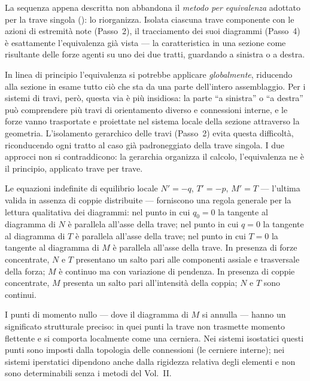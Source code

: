 \begin{oss}
	La sequenza appena descritta non abbandona il
	\emph{metodo per equivalenza} adottato per la trave
	singola (): lo riorganizza.
	Isolata ciascuna trave componente con le azioni di
	estremità note (Passo~2), il tracciamento dei suoi
	diagrammi (Passo~4) è esattamente l'equivalenza già
	vista --- la caratteristica in una sezione come
	risultante delle forze agenti su uno dei due tratti,
	guardando a sinistra o a destra.
	
	In linea di principio l'equivalenza si potrebbe
	applicare \emph{globalmente}, riducendo alla sezione
	in esame tutto ciò che sta da una parte dell'intero
	assemblaggio. Per i sistemi di travi, però, questa via
	è più insidiosa: la parte ``a sinistra'' o ``a destra''
	può comprendere più travi di orientamento diverso e
	connessioni interne, e le forze vanno trasportate e
	proiettate nel sistema locale della sezione attraverso
	la geometria. L'isolamento gerarchico delle travi
	(Passo~2) evita questa difficoltà, riconducendo ogni
	tratto al caso già padroneggiato della trave singola.
	I due approcci non si contraddicono: la gerarchia
	organizza il calcolo, l'equivalenza ne è il principio,
	applicato trave per trave.
\end{oss}

\begin{oss}
	Le equazioni indefinite di equilibrio locale
	$N' = -q$, $T' = -p$, $M' = T$ --- l'ultima valida in assenza di coppie distribuite ---
	forniscono una regola generale per la lettura
	qualitativa dei diagrammi: nel punto in cui
	$q_0 = 0$ la tangente al diagramma di $N$
	è parallela all'asse della trave; nel punto
	in cui $q = 0$ la tangente al diagramma di $T$
	è parallela all'asse della trave; nel punto
	in cui $T = 0$ la tangente al diagramma di $M$
	è parallela all'asse della trave.
	In presenza di forze concentrate, $N$ e $T$
	presentano un salto pari alle componenti
	assiale e trasversale della forza; $M$ è
	continuo ma con variazione di pendenza.
	In presenza di coppie concentrate, $M$
	presenta un salto pari all'intensità della
	coppia; $N$ e $T$ sono continui.
\end{oss}

\begin{oss}
	I punti di momento nullo --- dove il
	diagramma di $M$ si annulla --- hanno
	un significato strutturale preciso:
	in quei punti la trave non trasmette
	momento flettente e si comporta
	localmente come una cerniera. Nei
	sistemi isostatici questi punti sono
	imposti dalla topologia delle connessioni
	(le cerniere interne); nei sistemi
	iperstatici dipendono anche dalla
	rigidezza relativa degli elementi e
	non sono determinabili senza i metodi
	del Vol.~II.
\end{oss}


